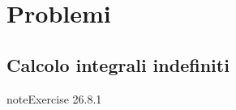 \documentclass[letterpaper,10pt,italian]{jupyterBook}
\begin{document}
\section{Problemi}
\label{\detokenize{ch/infinitesimal_calculus/integrals-problems:problemi}}\label{\detokenize{ch/infinitesimal_calculus/integrals-problems:infinitesimal-calculus-integrals-problems}}\label{\detokenize{ch/infinitesimal_calculus/integrals-problems::doc}}

\subsection{Calcolo integrali indefiniti}
\label{\detokenize{ch/infinitesimal_calculus/integrals-problems:calcolo-integrali-indefiniti}} \label{exercise:integral-ex-indefinite}

\begin{sphinxadmonition}{note}{Exercise 26.8.1}




\end{sphinxadmonition}
\end{document}
